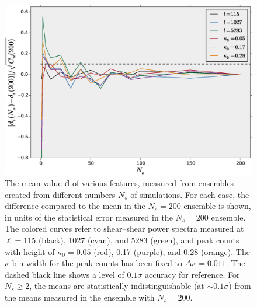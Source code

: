 \documentclass[reprint,aps,prd,superscriptaddress,showkeys,showpacs]{revtex4-1}
\newcommand{\bb}[1]{\mathbf{#1}}
\begin{document}
\begin{figure}
\includegraphics[scale=0.3]{Figures/means_ns.eps}
\caption{The mean value $\bb{\bar{d}}$
  of various features, measured from ensembles created from different
  numbers $N_s$ of simulations.  For each case, the difference compared
  to the mean in the $N_s=200$ ensemble is shown, in units of the
  statistical error measured in the $N_s=200$ ensemble.  The colored
  curves refer to shear--shear power spectra measured at $\ell=115$
  (black), 1027 (cyan), and 5283 (green), and peak counts 
  with height of $\kappa_0=0.05$ (red), 0.17 (purple), and 0.28
  (orange). The $\kappa$ bin width for the peak counts has been fixed to $\Delta\kappa=0.011$. The dashed black line shows a level of $0.1\sigma$ accuracy for reference.  For $N_s\geq 2$, the means are statistically indistinguishable (at $\sim0.1\sigma$) from the means measured in the ensemble with $N_s=200$.}
\label{means_ns}
\end{figure}
\end{document}
